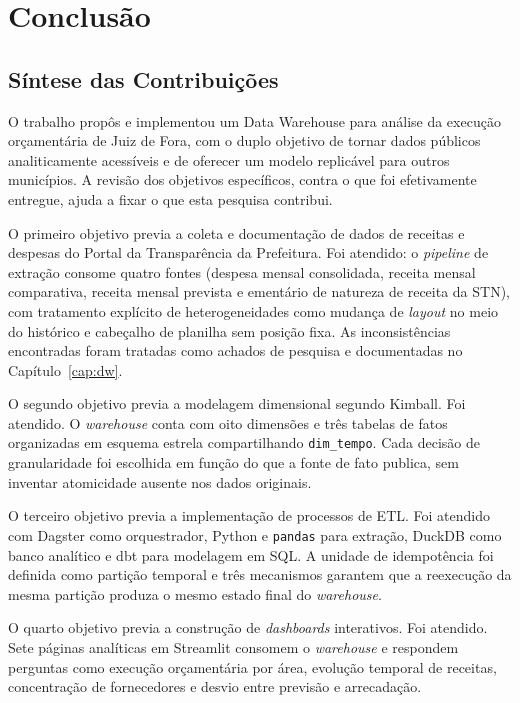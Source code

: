 \chapter{Conclusão}
\label{cap:conclusao}

\section{Síntese das Contribuições}

O trabalho propôs e implementou um Data Warehouse para análise da execução orçamentária de Juiz de Fora, com o duplo objetivo de tornar dados públicos analiticamente acessíveis e de oferecer um modelo replicável para outros municípios. A revisão dos objetivos específicos, contra o que foi efetivamente entregue, ajuda a fixar o que esta pesquisa contribui.

O primeiro objetivo previa a coleta e documentação de dados de receitas e despesas do Portal da Transparência da Prefeitura. Foi atendido: o \textit{pipeline} de extração consome quatro fontes (despesa mensal consolidada, receita mensal comparativa, receita mensal prevista e ementário de natureza de receita da STN), com tratamento explícito de heterogeneidades como mudança de \textit{layout} no meio do histórico e cabeçalho de planilha sem posição fixa. As inconsistências encontradas foram tratadas como achados de pesquisa e documentadas no Capítulo~\ref{cap:dw}.

O segundo objetivo previa a modelagem dimensional segundo Kimball. Foi atendido. O \textit{warehouse} conta com oito dimensões e três tabelas de fatos organizadas em esquema estrela compartilhando \texttt{dim\_tempo}. Cada decisão de granularidade foi escolhida em função do que a fonte de fato publica, sem inventar atomicidade ausente nos dados originais.

O terceiro objetivo previa a implementação de processos de ETL. Foi atendido com Dagster como orquestrador, Python e \texttt{pandas} para extração, DuckDB como banco analítico e dbt para modelagem em SQL. A unidade de idempotência foi definida como partição temporal e três mecanismos garantem que a reexecução da mesma partição produza o mesmo estado final do \textit{warehouse}.

O quarto objetivo previa a construção de \textit{dashboards} interativos. Foi atendido. Sete páginas analíticas em Streamlit consomem o \textit{warehouse} e respondem perguntas como execução orçamentária por área, evolução temporal de receitas, concentração de fornecedores e desvio entre previsão e arrecadação. 

